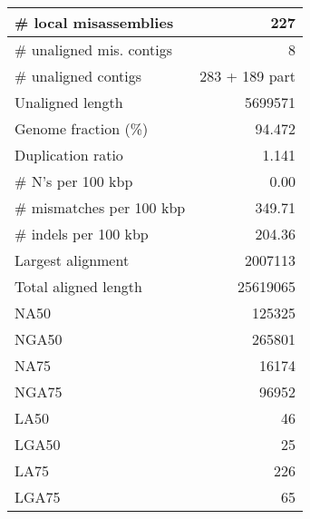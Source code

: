 \documentclass[12pt,a4paper]{article}
\begin{document}
\begin{table}[ht]
\begin{center}
\begin{tabular}{|l*{1}{|r}|}
\# local misassemblies & 227 \\ \hline
\# unaligned mis. contigs & 8 \\ \hline
\# unaligned contigs & 283 + 189 part \\ \hline
Unaligned length & 5699571 \\ \hline
Genome fraction (\%) & 94.472 \\ \hline
Duplication ratio & 1.141 \\ \hline
\# N's per 100 kbp & 0.00 \\ \hline
\# mismatches per 100 kbp & 349.71 \\ \hline
\# indels per 100 kbp & 204.36 \\ \hline
Largest alignment & 2007113 \\ \hline
Total aligned length & 25619065 \\ \hline
NA50 & 125325 \\ \hline
NGA50 & 265801 \\ \hline
NA75 & 16174 \\ \hline
NGA75 & 96952 \\ \hline
LA50 & 46 \\ \hline
LGA50 & 25 \\ \hline
LA75 & 226 \\ \hline
LGA75 & 65 \\ \hline
\end{tabular}
\end{center}
\end{table}
\end{document}
